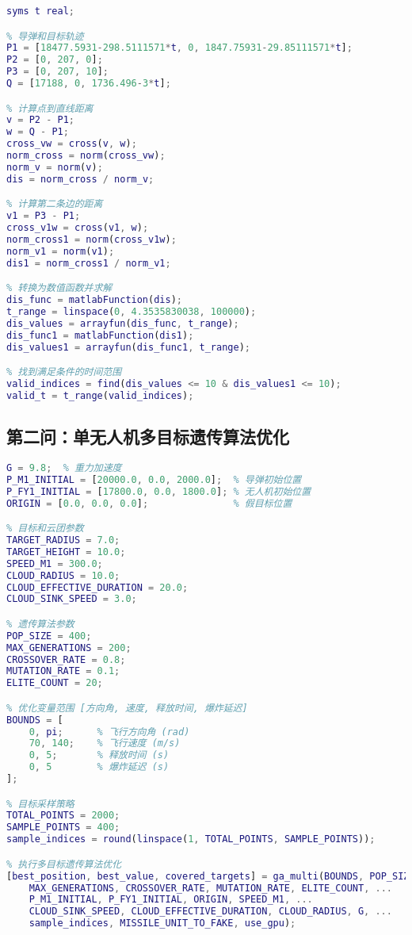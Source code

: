\begin{lstlisting}[language=Matlab,caption={第一问解法二：点到直线距离核心代码}]
% 定义符号变量
syms t real;

% 导弹和目标轨迹
P1 = [18477.5931-298.5111571*t, 0, 1847.75931-29.85111571*t];
P2 = [0, 207, 0];
P3 = [0, 207, 10];
Q = [17188, 0, 1736.496-3*t];

% 计算点到直线距离
v = P2 - P1;
w = Q - P1;
cross_vw = cross(v, w);
norm_cross = norm(cross_vw);
norm_v = norm(v);
dis = norm_cross / norm_v;

% 计算第二条边的距离
v1 = P3 - P1;
cross_v1w = cross(v1, w);
norm_cross1 = norm(cross_v1w);
norm_v1 = norm(v1);
dis1 = norm_cross1 / norm_v1;

% 转换为数值函数并求解
dis_func = matlabFunction(dis);
t_range = linspace(0, 4.3535830038, 100000);
dis_values = arrayfun(dis_func, t_range);
dis_func1 = matlabFunction(dis1);
dis_values1 = arrayfun(dis_func1, t_range);

% 找到满足条件的时间范围
valid_indices = find(dis_values <= 10 & dis_values1 <= 10);
valid_t = t_range(valid_indices);
\end{lstlisting}

\subsection{第二问：单无人机多目标遗传算法优化}

\begin{lstlisting}[language=Matlab,caption={第二问核心优化代码}]
% 物理参数初始化
G = 9.8;  % 重力加速度
P_M1_INITIAL = [20000.0, 0.0, 2000.0];  % 导弹初始位置
P_FY1_INITIAL = [17800.0, 0.0, 1800.0]; % 无人机初始位置
ORIGIN = [0.0, 0.0, 0.0];               % 假目标位置

% 目标和云团参数
TARGET_RADIUS = 7.0;
TARGET_HEIGHT = 10.0;
SPEED_M1 = 300.0;
CLOUD_RADIUS = 10.0;
CLOUD_EFFECTIVE_DURATION = 20.0;
CLOUD_SINK_SPEED = 3.0;

% 遗传算法参数
POP_SIZE = 400;
MAX_GENERATIONS = 200;
CROSSOVER_RATE = 0.8;
MUTATION_RATE = 0.1;
ELITE_COUNT = 20;

% 优化变量范围 [方向角, 速度, 释放时间, 爆炸延迟]
BOUNDS = [
    0, pi;      % 飞行方向角 (rad)
    70, 140;    % 飞行速度 (m/s)
    0, 5;       % 释放时间 (s)
    0, 5        % 爆炸延迟 (s)
];

% 目标采样策略
TOTAL_POINTS = 2000;
SAMPLE_POINTS = 400;
sample_indices = round(linspace(1, TOTAL_POINTS, SAMPLE_POINTS));

% 执行多目标遗传算法优化
[best_position, best_value, covered_targets] = ga_multi(BOUNDS, POP_SIZE, ...
    MAX_GENERATIONS, CROSSOVER_RATE, MUTATION_RATE, ELITE_COUNT, ...
    P_M1_INITIAL, P_FY1_INITIAL, ORIGIN, SPEED_M1, ...
    CLOUD_SINK_SPEED, CLOUD_EFFECTIVE_DURATION, CLOUD_RADIUS, G, ...
    sample_indices, MISSILE_UNIT_TO_FAKE, use_gpu);
\end{lstlisting}

